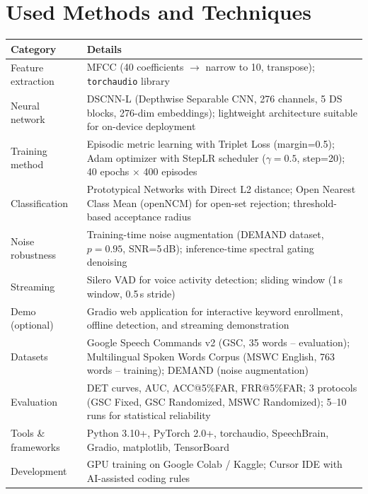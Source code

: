 \documentclass[12pt,a4paper]{article}
\begin{document}
\section*{Used Methods and Techniques}

\begin{tabularx}{\textwidth}{@{}l X}
    \toprule
    \textbf{Category} & \textbf{Details} \\
    \midrule
    Feature extraction &
        MFCC (40 coefficients $\rightarrow$ narrow to 10, transpose);
        \texttt{torchaudio} library \\[0.3cm]
    Neural network &
        DSCNN-L (Depthwise Separable CNN, 276 channels, 5 DS blocks,
        276-dim embeddings); lightweight architecture suitable for
        on-device deployment \\[0.3cm]
    Training method &
        Episodic metric learning with Triplet Loss (margin=0.5);
        Adam optimizer with StepLR scheduler ($\gamma=0.5$, step=20);
        40 epochs $\times$ 400 episodes \\[0.3cm]
    Classification &
        Prototypical Networks with Direct L2 distance;
        Open Nearest Class Mean (openNCM) for open-set rejection;
        threshold-based acceptance radius \\[0.3cm]
    Noise robustness &
        Training-time noise augmentation (DEMAND dataset, $p=0.95$,
        SNR=5\,dB); inference-time spectral gating denoising \\[0.3cm]
    Streaming &
        Silero VAD for voice activity detection;
        sliding window (1\,s window, 0.5\,s stride) \\[0.3cm]
    Demo (optional) &
        Gradio web application for interactive keyword enrollment,
        offline detection, and streaming demonstration \\[0.3cm]
    Datasets &
        Google Speech Commands v2 (GSC, 35 words -- evaluation);
        Multilingual Spoken Words Corpus (MSWC English, 763 words -- training);
        DEMAND (noise augmentation) \\[0.3cm]
    Evaluation &
        DET curves, AUC, ACC@5\%FAR, FRR@5\%FAR;
        3 protocols (GSC Fixed, GSC Randomized, MSWC Randomized);
        5--10 runs for statistical reliability \\[0.3cm]
    Tools \& frameworks &
        Python 3.10+, PyTorch 2.0+, torchaudio, SpeechBrain,
        Gradio, matplotlib, TensorBoard \\[0.3cm]
    Development &
        GPU training on Google Colab / Kaggle;
        Cursor IDE with AI-assisted coding rules \\
    \bottomrule
\end{tabularx}
\end{document}
